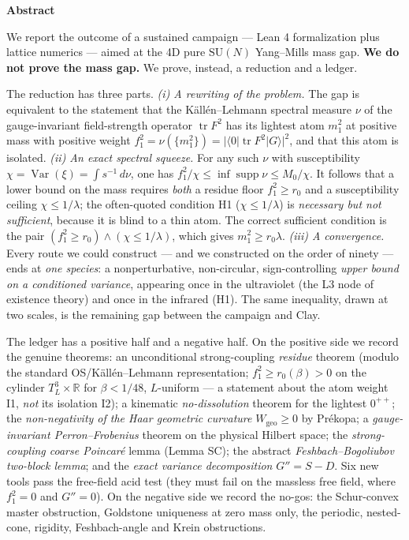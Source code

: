 \documentclass[11pt,a4paper]{article}
\begin{document}
\begin{tcolorbox}[enhanced, breakable, colback=white, colframe=white, boxrule=0pt,
  left=6pt, right=6pt, top=4pt, bottom=4pt, parbox=false]
\begin{center}{\large\bfseries Abstract}\end{center}
\footnotesize
\setlength{\parskip}{0pt}
We report the outcome of a sustained campaign --- Lean 4 formalization plus lattice numerics ---
aimed at the 4D pure $\mathrm{SU}(N)$ Yang--Mills mass gap. \textbf{We do not prove the mass
gap.} We prove, instead, a reduction and a ledger.

The reduction has three parts. \emph{(i) A rewriting of the problem.} The gap is equivalent to
the statement that the Källén--Lehmann spectral measure $\nu$ of the gauge-invariant
field-strength operator $\operatorname{tr}F^2$ has its lightest atom $m_1^2$ at positive mass
with positive weight $f_1^2 = \nu(\{m_1^2\}) = |\langle 0|\operatorname{tr}F^2|G\rangle|^2$, and
that this atom is isolated. \emph{(ii) An exact spectral squeeze.} For any such $\nu$ with
susceptibility $\chi = \operatorname{Var}(\xi) = \int s^{-1}\,d\nu$, one has
$f_1^2/\chi \le \inf\operatorname{supp}\nu \le M_0/\chi$. It follows that a lower bound on the
mass requires \emph{both} a residue floor $f_1^2 \ge r_0$ and a susceptibility ceiling
$\chi \le 1/\lambda$; the often-quoted condition H1 ($\chi \le 1/\lambda$) is \emph{necessary
but not sufficient}, because it is blind to a thin atom. The correct sufficient condition is the
pair $(f_1^2 \ge r_0) \wedge (\chi \le 1/\lambda)$, which gives $m_1^2 \ge r_0\lambda$.
\emph{(iii) A convergence.} Every route we could construct --- and we constructed on the order
of ninety --- ends at \emph{one species}: a nonperturbative, non-circular, sign-controlling
\emph{upper bound on a conditioned variance}, appearing once in the ultraviolet (the L3 node of
existence theory) and once in the infrared (H1). The same inequality, drawn at two scales, is
the remaining gap between the campaign and Clay.

The ledger has a positive half and a negative half. On the positive side we record the genuine
theorems: an unconditional strong-coupling \emph{residue} theorem (modulo the standard OS/Källén--Lehmann representation; $f_1^2 \ge r_0(\beta)>0$ on the cylinder $T^3_L\times\mathbb R$ for
$\beta<1/48$, $L$-uniform --- a statement about the atom weight I1, \emph{not} its
isolation I2); a kinematic \emph{no-dissolution} theorem for the lightest $0^{++}$; the
\emph{non-negativity of the Haar geometric curvature} $W_{\mathrm{geo}}\ge 0$ by Prékopa; a
\emph{gauge-invariant Perron--Frobenius} theorem on the physical Hilbert space; the
\emph{strong-coupling coarse Poincaré} lemma (Lemma SC); the abstract \emph{Feshbach--Bogoliubov
two-block lemma}; and the \emph{exact variance decomposition} $G''=S-D$. Six new tools pass the
free-field acid test (they must fail on the massless free field, where $f_1^2=0$ and $G''=0$).
On the negative side we record the no-gos: the Schur-convex master obstruction, Goldstone
uniqueness at zero mass only, the periodic, nested-cone, rigidity, Feshbach-angle and Krein
obstructions.


\end{tcolorbox}
\end{document}
